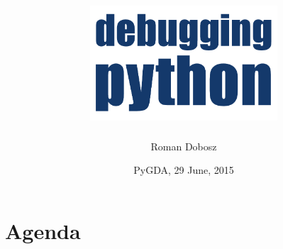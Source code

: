 \documentclass[14pt,notes,svgnames,aspectratio=169]{beamer}
\begin{document}
\title{%
    \includegraphics[width=7cm]{images/title.pdf}
}
\author{Roman Dobosz}
\date{PyGDA, 29 June, 2015}

\begin{frame}
  \titlepage
\end{frame}

\begingroup
    \section{Agenda}
\endgroup
\end{document}
